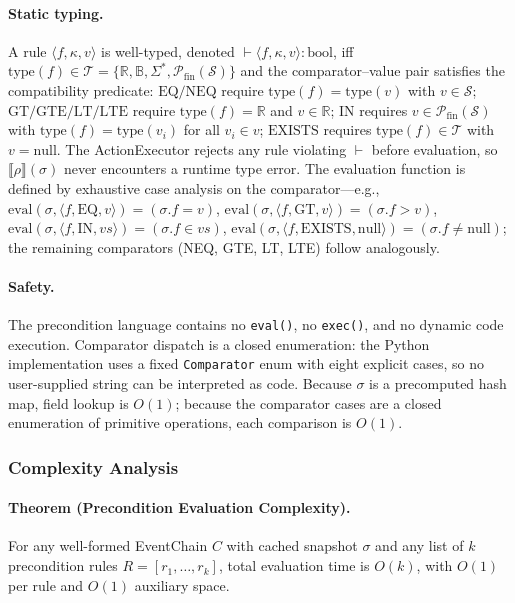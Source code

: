 \paragraph{Static typing.} A rule $\langle f, \kappa, v \rangle$ is well-typed, denoted $\vdash \langle f, \kappa, v \rangle : \text{bool}$, iff $\text{type}(f) \in \mathcal{T} = \{\mathbb{R}, \mathbb{B}, \Sigma^*, \mathcal{P}_{\text{fin}}(\mathcal{S})\}$ and the comparator--value pair satisfies the compatibility predicate: $\text{EQ}/\text{NEQ}$ require $\text{type}(f) = \text{type}(v)$ with $v \in \mathcal{S}$; $\text{GT}/\text{GTE}/\text{LT}/\text{LTE}$ require $\text{type}(f) = \mathbb{R}$ and $v \in \mathbb{R}$; $\text{IN}$ requires $v \in \mathcal{P}_{\text{fin}}(\mathcal{S})$ with $\text{type}(f) = \text{type}(v_i)$ for all $v_i \in v$; $\text{EXISTS}$ requires $\text{type}(f) \in \mathcal{T}$ with $v = \text{null}$. The ActionExecutor rejects any rule violating $\vdash$ before evaluation, so $\llbracket \rho \rrbracket(\sigma)$ never encounters a runtime type error. The evaluation function is defined by exhaustive case analysis on the comparator---e.g., $\text{eval}(\sigma, \langle f, \text{EQ}, v \rangle) = (\sigma.f = v)$, $\text{eval}(\sigma, \langle f, \text{GT}, v \rangle) = (\sigma.f > v)$, $\text{eval}(\sigma, \langle f, \text{IN}, vs \rangle) = (\sigma.f \in vs)$, $\text{eval}(\sigma, \langle f, \text{EXISTS}, \text{null} \rangle) = (\sigma.f \neq \text{null})$; the remaining comparators (NEQ, GTE, LT, LTE) follow analogously.

\paragraph{Safety.} The precondition language contains no \texttt{eval()}, no \texttt{exec()}, and no dynamic code execution. Comparator dispatch is a closed enumeration: the Python implementation uses a fixed \texttt{Comparator} enum with eight explicit cases, so no user-supplied string can be interpreted as code. Because $\sigma$ is a precomputed hash map, field lookup is $O(1)$; because the comparator cases are a closed enumeration of primitive operations, each comparison is $O(1)$.

\subsubsection{Complexity Analysis}\label{subsubsec:complexity-analysis}

\paragraph{Theorem (Precondition Evaluation Complexity).} For any well-formed EventChain $C$ with cached snapshot $\sigma$ and any list of $k$ precondition rules $R = [r_1, \ldots, r_k]$, total evaluation time is $O(k)$, with $O(1)$ per rule and $O(1)$ auxiliary space.

